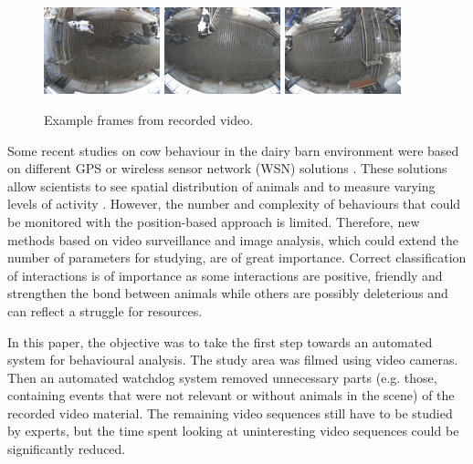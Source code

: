 \documentclass{cta-author}
\begin{document}
\begin{figure}[b]
\begin{center}
  \includegraphics[width=0.3\textwidth]{old-2.jpg}
  \includegraphics[width=0.3\textwidth]{old-1.jpg}
  \includegraphics[width=0.3\textwidth]{old-0.jpg}
\end{center}
  \caption{Example frames from recorded video.}
  \label{fig:old}
\end{figure}


Some recent studies on cow behaviour in the dairy barn environment were based on different GPS or wireless
sensor network (WSN) solutions \cite{Nadimietal2012}. These solutions allow scientists to see spatial
distribution of animals and to measure varying levels of activity \cite{Nadimietal2012}. However, the number
and complexity of behaviours that could be monitored with the position-based approach is limited. Therefore,
new methods based on video surveillance and image analysis, which could extend the number of parameters for
studying, are of great importance. Correct classification of interactions is of importance as some
interactions are positive, friendly and strengthen the bond between animals while others are possibly
deleterious and can reflect a struggle for resources.

In this paper, the objective was to take the first step towards an automated system for behavioural analysis.
The study area was filmed using video cameras. Then an automated watchdog system removed unnecessary parts
(e.g. those, containing events that were not relevant or without animals in the scene) of the recorded video
material. The remaining video sequences still have to be studied by experts, but the time spent
looking at uninteresting video sequences could be significantly reduced.
\end{document}
